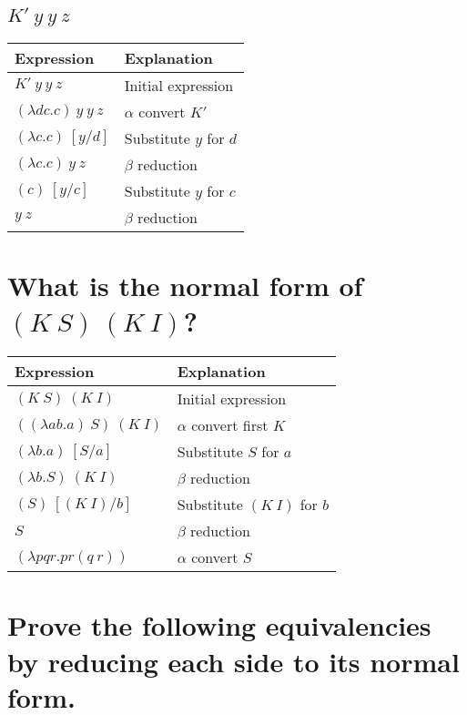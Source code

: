 \documentclass[letterpaper, 10pt, DIV=13]{scrartcl}
\numberwithin{equation}{section}
\numberwithin{figure}{section}
\numberwithin{table}{section}
\begin{document}
\subsection{$K'~y~y~z$}
\begin{center}
\begin{tabularx}{\textwidth}{|Y|Y|}
    \hline
    Expression & Explanation \\
    \hline
    $K'~y~y~z$ & Initial expression \\
    \hline
    $(\lambda dc.c)~y~y~z$ & $\alpha$ convert $K'$ \\
    \hline
    $(\lambda c.c)~[y / d]$ & Substitute $y$ for $d$ \\
    \hline
    $(\lambda c.c)~y~z$ & $\beta$ reduction \\
    \hline
    $(c)~[y / c]$ & Substitute $y$ for $c$ \\
    \hline
    $y~z$ & $\beta$ reduction \\
    \hline
\end{tabularx}
\end{center}

\section{What is the normal form of $(K~S)~(K~I)$?}
\begin{center}
\begin{tabularx}{\textwidth}{|Y|Y|}
    \hline
    Expression & Explanation \\
    \hline
    $(K~S)~(K~I)$ & Initial expression \\
    \hline
    $((\lambda ab.a)~S)~(K~I)$ & $\alpha$ convert first $K$ \\
    \hline
    $(\lambda b.a)~[S / a]$ & Substitute $S$ for $a$ \\
    \hline
    $(\lambda b.S)~(K~I)$ & $\beta$ reduction \\
    \hline
    $(S)~[(K~I) / b]$ & Substitute $(K~I)$ for $b$ \\
    \hline
    $S$ & $\beta$ reduction \\
    \hline
    $(\lambda pqr.pr(q~r))$ & $\alpha$ convert $S$ \\
    \hline
\end{tabularx}
\end{center}

\section{Prove the following equivalencies by reducing each side to its normal form.}
\end{document}

